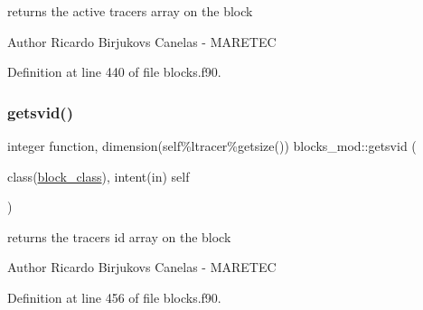 returns the active tracers array on the block 

\begin{DoxyAuthor}{Author}
Ricardo Birjukovs Canelas -\/ M\+A\+R\+E\+T\+EC 
\end{DoxyAuthor}


Definition at line 440 of file blocks.\+f90.


\mbox{\label{namespaceblocks__mod_af9cfa830fff1b8986efba72fa4c82473}} 
\subsubsection{\texorpdfstring{getsvid()}{getsvid()}}
{\footnotesize\ttfamily integer function, dimension(self\%ltracer\%getsize()) blocks\+\_\+mod\+::getsvid (\begin{DoxyParamCaption}\item[{class(\mbox{\hyperlink{structblocks__mod_1_1block__class}{block\+\_\+class}}), intent(in)}]{self }\end{DoxyParamCaption})\hspace{0.3cm}{\ttfamily [private]}}



returns the tracers id array on the block 

\begin{DoxyAuthor}{Author}
Ricardo Birjukovs Canelas -\/ M\+A\+R\+E\+T\+EC 
\end{DoxyAuthor}


Definition at line 456 of file blocks.\+f90.


